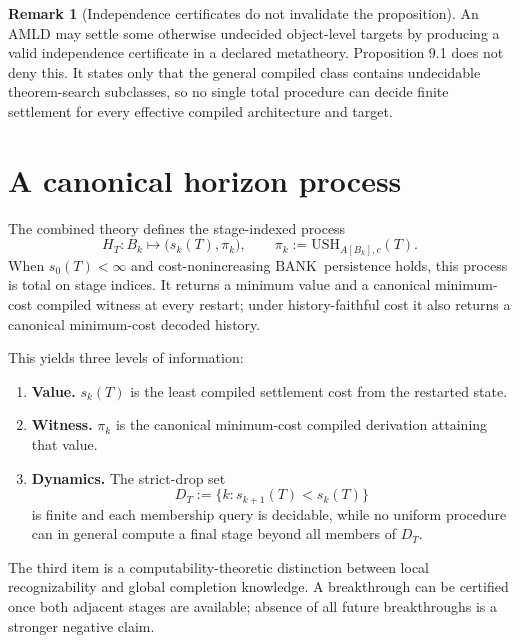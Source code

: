 \documentclass[11pt]{article}
\theoremstyle{definition}
\newtheorem{remark}[theorem]{Remark}
\newcommand{\BANK}{\ensuremath{\mathrm{BANK}}}
\newcommand{\USH}{\ensuremath{\mathrm{USH}}}
\begin{document}
\begin{remark}[Independence certificates do not invalidate the proposition]
An AMLD may settle some otherwise undecided object-level targets by producing a valid independence certificate in a declared metatheory. Proposition 9.1 does not deny this. It states only that the general compiled class contains undecidable theorem-search subclasses, so no single total procedure can decide finite settlement for every effective compiled architecture and target.
\end{remark}

\section{A canonical horizon process}
The combined theory defines the stage-indexed process
\[
H_T:B_k\longmapsto \bigl(s_k(T),\pi_k\bigr),
\qquad
\pi_k:=\USH_{A[B_k],c}(T).
\]
When $s_0(T)<\infty$ and cost-nonincreasing \BANK\ persistence holds, this process is total on stage indices. It returns a minimum value and a canonical minimum-cost compiled witness at every restart; under history-faithful cost it also returns a canonical minimum-cost decoded history.

This yields three levels of information:
\begin{enumerate}[label=(\arabic*)]
\item \textbf{Value.} $s_k(T)$ is the least compiled settlement cost from the restarted state.
\item \textbf{Witness.} $\pi_k$ is the canonical minimum-cost compiled derivation attaining that value.
\item \textbf{Dynamics.} The strict-drop set
\[
D_T:=\{k:s_{k+1}(T)<s_k(T)\}
\]
is finite and each membership query is decidable, while no uniform procedure can in general compute a final stage beyond all members of $D_T$.
\end{enumerate}

The third item is a computability-theoretic distinction between local recognizability and global completion knowledge. A breakthrough can be certified once both adjacent stages are available; absence of all future breakthroughs is a stronger negative claim.
\end{document}
